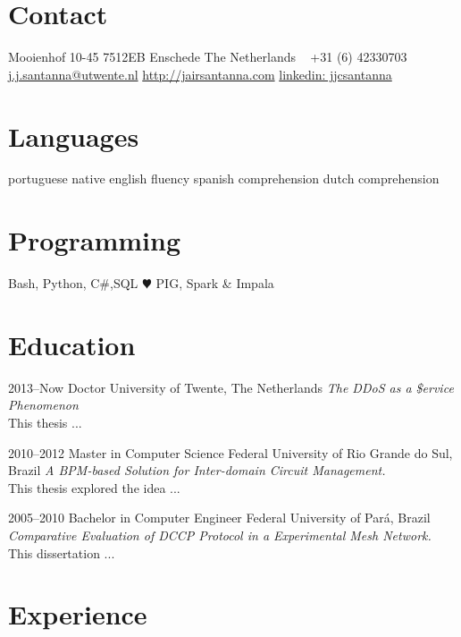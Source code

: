 \documentclass[]{friggeri-cv} %
\begin{document}

\begin{aside} %
\section{Contact}
Mooienhof 10-45
7512EB Enschede
The Netherlands
~
+31 (6) 42330703
~
\href{mailto:j.j.santanna@utwente.nl}{j.j.santanna@utwente.nl}
\href{http://jairsantanna.com}{http://jairsantanna.com}
\href{https://www.linkedin.com/in/jjcsantanna}{linkedin: jjcsantanna}
\section{Languages}
portuguese native 
english fluency
spanish comprehension
dutch comprehension
\section{Programming}
Bash, Python, C\#,SQL
{\color{green} $\varheartsuit$} PIG, Spark \& Impala
\end{aside}


\section{Education}

\begin{entrylist}
\entry
{2013--Now}
{Doctor}
{University of Twente, The Netherlands}
{\emph{The DDoS as a \$ervice Phenomenon} \\ 
This thesis ...}	

\entry
{2010--2012}
{Master {\normalfont in Computer Science}}
{Federal University of Rio Grande do Sul, Brazil}
{\emph{A BPM-based Solution for Inter-domain Circuit Management.} \\ 
This thesis explored the idea ...}

\entry
{2005--2010}
{Bachelor {\normalfont in Computer Engineer}}
{Federal University of Par\'a, Brazil}
{\emph{Comparative Evaluation of DCCP Protocol in a Experimental Mesh Network.} \\ 
This dissertation ...}

\end{entrylist}

\section{Experience}
\end{document}
